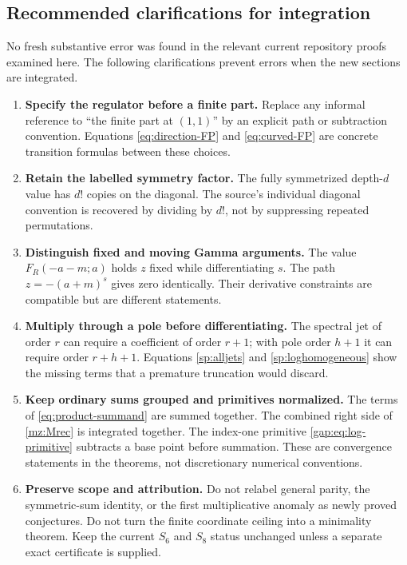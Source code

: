 \documentclass[11pt,letterpaper]{article}
\numberwithin{equation}{section}
\theoremstyle{plain}
\theoremstyle{definition}
\theoremstyle{remark}
\begin{document}
\subsection{Recommended clarifications for integration}

No fresh substantive error was found in the relevant current repository
proofs examined here. The following clarifications prevent errors when
the new sections are integrated.

\begin{enumerate}[leftmargin=*,itemsep=4pt]
\item \textbf{Specify the regulator before a finite part.}
Replace any informal reference to ``the finite part at $(1,1)$'' by an
explicit path or subtraction convention. Equations
\eqref{eq:direction-FP} and \eqref{eq:curved-FP} are concrete transition
formulas between these choices.
\item \textbf{Retain the labelled symmetry factor.}
The fully symmetrized depth-$d$ value has $d!$ copies on the diagonal.
The source's individual diagonal convention is recovered by dividing by
$d!$, not by suppressing repeated permutations.
\item \textbf{Distinguish fixed and moving Gamma arguments.}
The value $F_R(-a-m;a)$ holds $z$ fixed while differentiating $s$.
The path $z=-(a+m)^s$ gives zero identically. Their derivative constraints
are compatible but are different statements.
\item \textbf{Multiply through a pole before differentiating.}
The spectral jet of order $r$ can require a coefficient of order $r+1$;
with pole order $h+1$ it can require order $r+h+1$. Equations
\eqref{sp:alljets} and \eqref{sp:loghomogeneous} show the missing terms
that a premature truncation would discard.
\item \textbf{Keep ordinary sums grouped and primitives normalized.}
The terms of \eqref{eq:product-summand} are summed together.
The combined right side of \eqref{mz:Mrec} is integrated together.
The index-one primitive \eqref{gap:eq:log-primitive} subtracts a base
point before summation. These are convergence statements in the
theorems, not discretionary numerical conventions.
\item \textbf{Preserve scope and attribution.}
Do not relabel general parity, the symmetric-sum identity, or the first
multiplicative anomaly as newly proved conjectures. Do not turn the
finite coordinate ceiling into a minimality theorem. Keep the current
$S_6$ and $S_8$ status unchanged unless a separate exact certificate is
supplied.
\end{enumerate}
\end{document}
